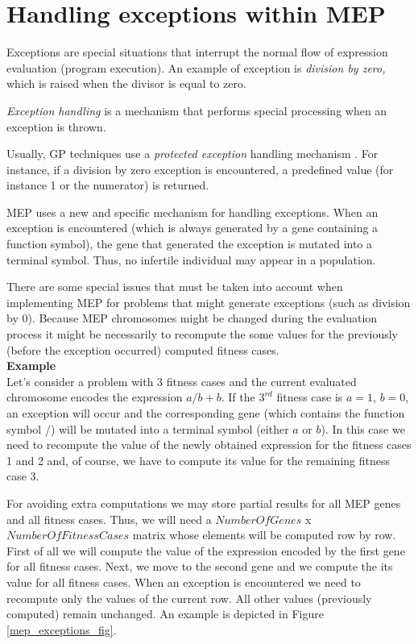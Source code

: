 \documentclass [11pt]{article}
\begin{document}
\section{Handling exceptions within MEP}\label{MEP_exceptions}

Exceptions are special situations that interrupt the normal flow of 
expression evaluation (program execution). An example of exception is 
\textit{division by zero,} which is raised when the divisor is equal to zero.

\textit{Exception handling} is a mechanism that performs special processing when an exception is 
thrown.

Usually, GP techniques use a \textit{protected exception} handling mechanism \cite{koza1}. For instance, if a 
division by zero exception is encountered, a predefined value (for instance 1 or the numerator) is returned.

MEP uses a new and specific mechanism for handling exceptions. When an 
exception is encountered (which is always generated by a gene containing a 
function symbol), the gene that generated the exception is mutated into a 
terminal symbol. Thus, no infertile individual may appear in a population.

There are some special issues that must be taken into account when implementing MEP for problems that might generate exceptions (such as division by 0). Because MEP chromosomes might be changed during the evaluation process it might be necessarily to recompute the some values for the previously (before the exception occurred) computed fitness cases.\\

\textbf{Example}\\

Let's consider a problem with 3 fitness cases and the current evaluated chromosome encodes the expression $a/b + b$. If the $3^{rd}$ fitness case is $a = 1$, $b = 0$, an exception will occur and the corresponding gene (which contains the function symbol /) will be mutated into a terminal symbol (either $a$ or $b$). In this case we need to recompute the value of the newly obtained expression for the fitness cases 1 and 2 and, of course, we have to compute its value for the remaining fitness case 3.

For avoiding extra computations we may store partial results for all MEP genes and all fitness cases. Thus, we will need a $NumberOfGenes$ x $NumberOfFitnessCases$ matrix whose elements will be computed row by row. First of all we will compute the value of the expression encoded by the first gene for all fitness cases. Next, we move to the second gene and we compute the its value for all fitness cases. When an exception is encountered we need to recompute only the values of the current row. All other values (previously computed) remain unchanged. An example is depicted in Figure \ref{mep_exceptions_fig}.
\end{document}
